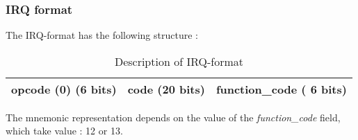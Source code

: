 \subsubsection*{IRQ format}

	The IRQ-format has the following structure :
	\begin{table}[H]
		\centering
		\begin{tabular}{|c|c|c|}
		\hline 
		opcode (0) (6 bits) & code (20 bits) & function\_code ( 6 bits) \\ 
		\hline 
		\end{tabular} 
		\caption{Description of IRQ-format}
	\end{table}
	
	The mnemonic representation depends on the value of the \textit{function\_code} field, which take value : 12 or 13.